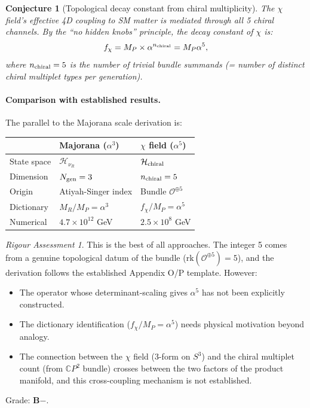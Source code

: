 \documentclass[11pt]{article}
\newtheorem{conjecture}[theorem]{Conjecture}
\theoremstyle{definition}
\theoremstyle{remark}
\newtheorem*{assessment}{Rigour Assessment}
\newcommand{\CP}{\mathbb{C}P}
\begin{document}
\begin{conjecture}[Topological decay constant from chiral multiplicity]
\label{conj:bundle}
The $\chi$ field's effective 4D coupling to SM matter is mediated through
all 5 chiral channels. By the ``no hidden knobs'' principle, the decay
constant of $\chi$ is:
\begin{equation}
f_\chi = M_P \times \alpha^{n_{\rm chiral}} = M_P \alpha^5,
\end{equation}
where $n_{\rm chiral} = 5$ is the number of trivial bundle summands
(= number of distinct chiral multiplet types per generation).
\end{conjecture}

\paragraph{Comparison with established results.}

The parallel to the Majorana scale derivation is:
\begin{center}
\renewcommand{\arraystretch}{1.3}
\begin{tabular}{lll}
\toprule
& \textbf{Majorana ($\alpha^3$)} & \textbf{$\chi$ field ($\alpha^5$)} \\
\midrule
State space & $\mathcal{H}_{\nu_R}$ & $\mathcal{H}_{\rm chiral}$ \\
Dimension & $N_{\rm gen} = 3$ & $n_{\rm chiral} = 5$ \\
Origin & Atiyah-Singer index & Bundle $\mathcal{O}^{\oplus 5}$ \\
Dictionary & $M_R/M_P = \alpha^3$ & $f_\chi/M_P = \alpha^5$ \\
Numerical & $4.7 \times 10^{12}$ GeV & $2.5 \times 10^8$ GeV \\
\bottomrule
\end{tabular}
\end{center}

\begin{assessment}
This is the best of all approaches. The integer 5 comes from a genuine
topological datum of the bundle ($\mathrm{rk}(\mathcal{O}^{\oplus 5}) = 5$),
and the derivation follows the established Appendix O/P template. However:
\begin{itemize}
\item The operator whose determinant-scaling gives $\alpha^5$ has not been
  explicitly constructed.
\item The dictionary identification ($f_\chi/M_P = \alpha^5$) needs physical
  motivation beyond analogy.
\item The connection between the $\chi$ field (3-form on $S^3$) and the
  chiral multiplet count (from $\CP^2$ bundle) crosses between the two
  factors of the product manifold, and this cross-coupling mechanism is
  not established.
\end{itemize}

Grade: \textbf{B$-$}.
\end{assessment}
\end{document}
